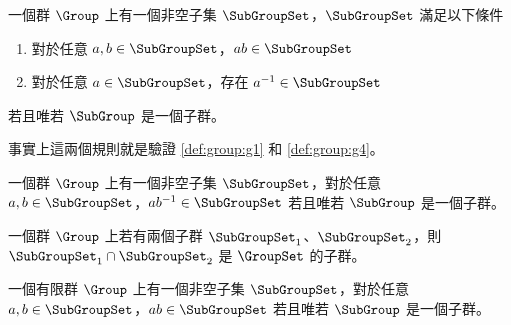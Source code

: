 \documentclass[12pt,a4paper,oneside]{report}
\begin{document}
\begin{CJK}{UTF8}{bkai}
\begin{mylma}[實用版子群]
\label{lma:group:two_rule_subgroup}
一個群 $\Group$ 上有一個非空子集 $\SubGroupSet$，$\SubGroupSet$ 滿足以下條件
\begin{enumerate}
\item 對於任意 $a,b\in{\SubGroupSet}$，$ab\in{\SubGroupSet}$
\item 對於任意 $a\in{\SubGroupSet}$，存在 $a^{-1}\in{\SubGroupSet}$
\end{enumerate}
若且唯若 $\SubGroup$ 是一個子群。
\end{mylma}
\begin{mynote*}
事實上這兩個規則就是驗證 \ref{def:group:g1} 和 \ref{def:group:g4}。
\end{mynote*}

\begin{mylma}[精簡版子群]
\label{lma:group:one_rule_subgroup}
一個群 $\Group$ 上有一個非空子集 $\SubGroupSet$，對於任意 $a,b\in{\SubGroupSet}$，$ab^{-1}\in{\SubGroupSet}$ 若且唯若 $\SubGroup$ 是一個子群。
\end{mylma}

\begin{mypropo}
\label{pro:group:two_subgroup_intersection}
一個群 $\Group$ 上若有兩個子群 $\SubGroupSet_1$、$\SubGroupSet_2$，則 ${\SubGroupSet_1}\cap{\SubGroupSet_2}$ 是 $\GroupSet$ 的子群。
\end{mypropo}

\begin{mythm}[有限子群]
一個有限群 $\Group$ 上有一個非空子集 $\SubGroupSet$，對於任意 $a,b\in{\SubGroupSet}$，$ab\in{\SubGroupSet}$ 若且唯若 $\SubGroup$ 是一個子群。
\end{mythm}

\ifx \allfiles \undefined
\printindex[noun]

\clearpage
\end{CJK}
\end{document}
